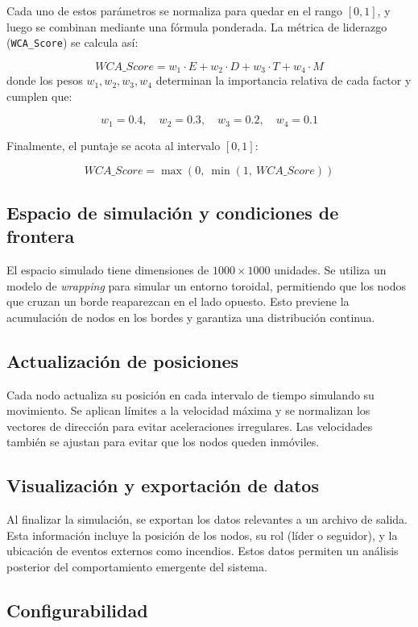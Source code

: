 \documentclass{article}
\begin{document}
Cada uno de estos parámetros se normaliza para quedar en el rango \([0,1]\), y luego se combinan mediante una fórmula ponderada. La métrica de liderazgo (\texttt{WCA\_Score}) se calcula así:

\[
{WCA\_Score} = w_1 \cdot E + w_2 \cdot D + w_3 \cdot T + w_4 \cdot M
\]
donde los pesos \(w_1, w_2, w_3, w_4\) determinan la importancia relativa de cada factor y cumplen que:

\[
w_1 = 0.4, \quad w_2 = 0.3, \quad w_3 = 0.2, \quad w_4 = 0.1
\]

Finalmente, el puntaje se acota al intervalo \([0, 1]\):

\[
{WCA\_Score} = \max\left(0,\ \min\left(1,\ {WCA\_Score}\right)\right)
\]
\subsection{Espacio de simulación y condiciones de frontera}

El espacio simulado tiene dimensiones de $1000 \times 1000$ unidades. Se utiliza un modelo de \textit{wrapping} para simular un entorno toroidal, permitiendo que los nodos que cruzan un borde reaparezcan en el lado opuesto. Esto previene la acumulación de nodos en los bordes y garantiza una distribución continua.

\subsection{Actualización de posiciones}

Cada nodo actualiza su posición en cada intervalo de tiempo simulando su movimiento. Se aplican límites a la velocidad máxima y se normalizan los vectores de dirección para evitar aceleraciones irregulares. Las velocidades también se ajustan para evitar que los nodos queden inmóviles.

\subsection{Visualización y exportación de datos}

Al finalizar la simulación, se exportan los datos relevantes a un archivo de salida. Esta información incluye la posición de los nodos, su rol (líder o seguidor), y la ubicación de eventos externos como incendios. Estos datos permiten un análisis posterior del comportamiento emergente del sistema.

\subsection{Configurabilidad}
\end{document}
